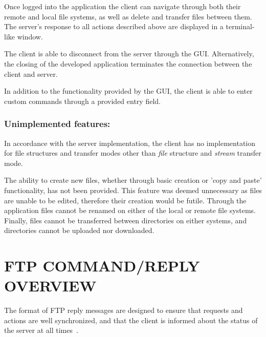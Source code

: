 \documentclass[10pt,twocolumn]{witseiepaper}
\begin{document}

Once logged into the application the client can navigate through both their remote and local file systems, as well as delete and transfer files between them. The server's response to all actions described above are displayed in a terminal-like window. 

The client is able to disconnect from the server through the GUI. Alternatively, the closing of the developed application terminates the connection between the client and server.

In addition to the functionality provided by the GUI, the client is able to enter custom commands through a provided entry field. 


\vspace*{-\baselineskip}
\subsubsection*{Unimplemented features: } 
In accordance with the server implementation, the client has no implementation for file structures and transfer modes other than \textit{file} structure and \textit{stream} transfer mode.

The ability to create new files, whether through basic creation or 'copy and paste' functionality, has not been provided. This feature was deemed unnecessary as files are unable to be edited, therefore their creation would be futile. Through the application files cannot be renamed on either of the local or remote file systems. Finally, files cannot be transferred between directories on either systems, and directories cannot be uploaded nor downloaded.


\section{FTP COMMAND/REPLY OVERVIEW}\label{sec:command/reply}

The format of FTP reply messages are designed to ensure that requests and actions are well synchronized, and that the client is informed about the status of the server at all times~\cite{rfc959}. 
\end{document}
